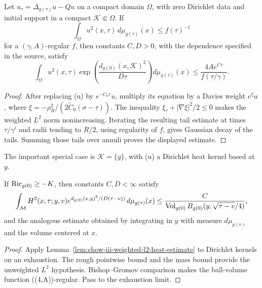 \begin{lemma}
\label{lem:chow-iii-weighted-l2-heat-estimate}
Let \(u_\tau=\Delta_{g(\tau)}u-Qu\) on a compact domain \(\Omega\), with
zero Dirichlet data and initial support in a compact \(\mathcal K\Subset\Omega\).
If
\[
 \int_\Omega u^2(x,\tau)\,d\mu_{g(\tau)}(x)\le f(\tau)^{-1}
\]
for a \((\gamma,A)\)-regular \(f\), then constants \(C,D>0\), with the
dependence specified in the source, satisfy
\[
 \int_\Omega u^2(x,\tau)
 \exp\!\left(\frac{d_{g(0)}(x,\mathcal K)^2}{D\tau}\right)
 d\mu_{g(\tau)}(x)
 \le \frac{4Ae^{C\tau}}{f(\tau/\gamma)}.
\]
\end{lemma}
\begin{proof}
After replacing (u) by \(e^{-C_0\tau}u\), multiply its equation by a
Davies weight \(e^\xi u\), where
\(\xi=-\rho_R^2/(2\widetilde C_0(\sigma-\tau))\).  The inequality
\(\xi_\tau+|\nabla\xi|^2/2\le0\) makes the weighted \(L^2\) norm
nonincreasing.  Iterating the resulting tail estimate at times
\(\tau/\gamma^i\) and radii tending to \(R/2\), using regularity of \(f\),
gives Gaussian decay of the tails.  Summing those tails over annuli proves
the displayed estimate.
\end{proof}

\begin{remark}
\label{rem:chow-iii-weighted-l2-point-source}
The important special case is \(\mathcal K=\{y\}\), with (u) a Dirichlet
heat kernel based at \(y\).
\end{remark}

\begin{lemma}
\label{lem:chow-iii-heat-kernel-average-gaussian-decay}
If \(\operatorname{Ric}_{g(0)}\ge-K\), then constants \(C,D<\infty\) satisfy
\[
 \int_{\mathcal M}H^2(x,\tau;y,v)
 e^{d_{g(0)}(x,y)^2/(D(\tau-v))}\,d\mu_{g(\tau)}(x)
 \le\frac{C}{\Vol_{g(0)}B_{g(0)}(y,\sqrt{\tau-v}/4)},
\]
and the analogous estimate obtained by integrating in \(y\) with measure
\(d\mu_{g(v)}\) and the volume centered at \(x\).
\end{lemma}
\begin{proof}
Apply Lemma~\ref{lem:chow-iii-weighted-l2-heat-estimate} to Dirichlet kernels
on an exhaustion.  The rough pointwise bound and the mass bound provide the
unweighted \(L^2\) hypothesis.  Bishop--Gromov comparison makes the ball-volume
function ((4,A))-regular.  Pass to the exhaustion limit.
\end{proof}

